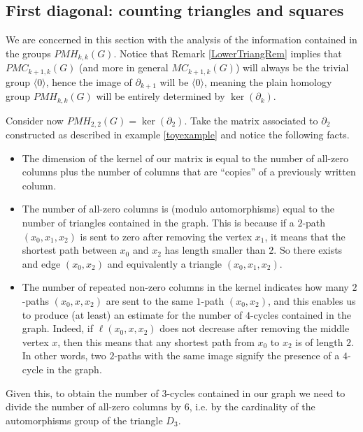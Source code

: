 \documentclass{article}
\begin{document}
	
	\subsection{First diagonal: counting triangles and squares}
	\label{FirstDiagonal}
	We are concerned in this section with the analysis of the information contained in the groups $PMH_{k,k}(G)$.
	Notice that Remark \ref{LowerTriangRem} implies that $PMC_{k+1,k}(G)$ (and more in general $MC_{k+1,k}(G)$) will always be the trivial group $\langle 0 \rangle$, hence the image of $\partial_{k+1}$ will be $\langle 0 \rangle$, meaning the plain homology group $PMH_{k,k}(G)$ will be entirely determined by $\ker(\partial_k)$.
	
	
	Consider now $PMH_{2,2}(G)=\ker(\partial_2)$.
	Take the matrix associated to $\partial_2$ constructed as described in example \ref{toyexample} and notice the following facts.
	
	\begin{itemize}
		\item The dimension of the kernel of our matrix is equal to the number of all-zero columns plus the number of columns that are ``copies'' of a previously written column.
		\item The number of all-zero columns is (modulo automorphisms) equal to the number of triangles contained in the graph. 
		This is because if a $2$-path $(x_0,x_1,x_2)$ is sent to zero after removing the vertex $x_1$, it means that the shortest path between $x_0$ and $x_2$ has length smaller than $2$. 
		So there exists and edge $(x_0,x_2)$ and equivalently a triangle $(x_0,x_1,x_2)$.
		\item The number of repeated non-zero columns in the kernel indicates how many $2$-paths $(x_0,x,x_2)$ are sent to the same $1$-path $(x_0,x_2)$, and this enables us to produce (at least) an estimate for the number of $4$-cycles contained in the graph.
		Indeed, if $\ell(x_0,x,x_2)$ does not decrease after removing the middle vertex $x$, then this means that any shortest path from $x_0$ to $x_2$ is of length $2$. In other words, two $2$-paths with the same image signify the presence of a $4$-cycle in the graph.
	\end{itemize}
	
	Given this, to obtain the number of $3$-cycles contained in our graph we need to divide the number of all-zero columns by $6$, i.e. by the cardinality of the automorphisms group of the triangle $D_3$.
	
\end{document}
